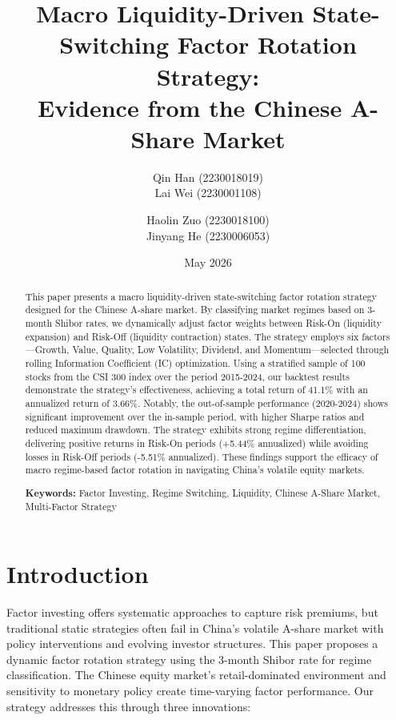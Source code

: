 \documentclass[12pt,a4paper]{article}
\title{\textbf{Macro Liquidity-Driven State-Switching Factor Rotation Strategy:\\Evidence from the Chinese A-Share Market}}
\author{Qin Han (2230018019) \\ Lai Wei (2230001108) \and Haolin Zuo (2230018100) \\ Jinyang He (2230006053)}
\date{May 2026}
\begin{document}
\pagestyle{plain}
\maketitle

\vspace{-0.5cm}

\begin{abstract}
\small
This paper presents a macro liquidity-driven state-switching factor rotation strategy designed for the Chinese A-share market. By classifying market regimes based on 3-month Shibor rates, we dynamically adjust factor weights between Risk-On (liquidity expansion) and Risk-Off (liquidity contraction) states. The strategy employs six factors—Growth, Value, Quality, Low Volatility, Dividend, and Momentum—selected through rolling Information Coefficient (IC) optimization. Using a stratified sample of 100 stocks from the CSI 300 index over the period 2015-2024, our backtest results demonstrate the strategy's effectiveness, achieving a total return of 41.1\% with an annualized return of 3.66\%. Notably, the out-of-sample performance (2020-2024) shows significant improvement over the in-sample period, with higher Sharpe ratios and reduced maximum drawdown. The strategy exhibits strong regime differentiation, delivering positive returns in Risk-On periods (+5.44\% annualized) while avoiding losses in Risk-Off periods (-5.51\% annualized). These findings support the efficacy of macro regime-based factor rotation in navigating China's volatile equity markets.

\vspace{0.2cm}
\vspace{0.2cm}
\noindent\textbf{Keywords:} Factor Investing, Regime Switching, Liquidity, Chinese A-Share Market, Multi-Factor Strategy
\end{abstract}

\vspace{0.2cm}

\section{Introduction}

Factor investing offers systematic approaches to capture risk premiums, but traditional static strategies often fail in China's volatile A-share market with policy interventions and evolving investor structures. This paper proposes a dynamic factor rotation strategy using the 3-month Shibor rate for regime classification. The Chinese equity market's retail-dominated environment and sensitivity to monetary policy create time-varying factor performance. Our strategy addresses this through three innovations:
\end{document}
